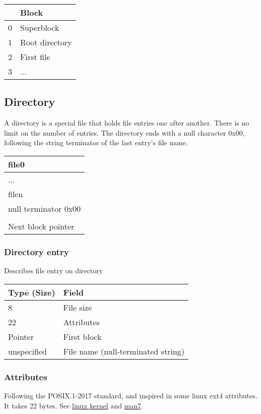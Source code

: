 \documentclass[]{article}
\begin{document}
	\begin{tabular}{|l|l|} 
		\hline
		 & \textbf{Block} \\ [0.5ex] 
		\hline
		0 & Superblock \\
		\hline
		1 & Root directory \\
		\hline
		2 & First file \\
		\hline
		3 & ... \\
		\hline
	\end{tabular}

	\subsection{Directory}
	
	A directory is a special file that holds file entries one after another. There is no limit on the number of entries. The directory ends with a null character 0x00, following the string terminator of the last entry's file name.
	
	\begin{tabular}{|l|} 
		\hline
		file0 \\ 
		\hline
		... \\
		\hline
		filen \\
		\hline
		null terminator 0x00 \\
		\hline
		[Padding] \\
		\hline
		Next block pointer \\
		\hline
	\end{tabular}

	\subsubsection{Directory entry}
	Describes file entry on directory

	\begin{tabular}{|l|l|} 
		\hline
		\textbf{Type (Size)} & \textbf{Field} \\ [0.5ex] 
		\hline
		8 & File size \\
		\hline
		22 & Attributes \\
		\hline
		Pointer & First block \\
		\hline
		unspecified & File name (null-terminated string) \\
		\hline
	\end{tabular}

	\subsubsection{Attributes}
	Following the POSIX.1-2017 standard, and inspired in some linux ext4 attributes. It takes 22 bytes.
	See \href{https://ext4.wiki.kernel.org/index.php/Ext4\_Disk\_Layout\#Inode\_Table}{linux kernel} and \href{https://man7.org/linux/man-pages/man3/stat.3type.html}{man7}.
	
\end{document}

